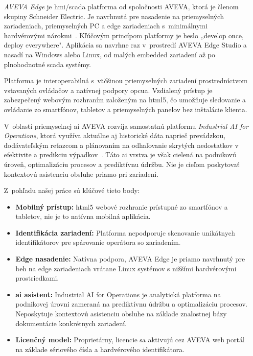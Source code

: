 \textit{AVEVA Edge} je \acrshort{hmi}/\acrshort{scada} platforma od
spoločnosti AVEVA, ktorá je členom skupiny Schneider Electric. Je navrhnutá pre nasadenie
na priemyselných zariadeniach, priemyselných PC a edge zariadeniach
s~minimálnymi hardvérovými nárokmi~\cite{t06}. Kľúčovým princípom platformy je
heslo „develop once, deploy everywhere". Aplikácia sa navrhne raz v~prostredí
AVEVA Edge Studio a nasadí na Windows alebo Linux, od malých embedded zariadení až po plnohodnotné \acrshort{scada} systémy.

Platforma je interoperabilná s~väčšinou priemyselných zariadení prostredníctvom
vstavaných ovládačov a natívnej podpory \acrshort{opcua}. Vzdialený prístup je
zabezpečený webovým rozhraním založeným na \acrshort{html}5, čo umožňuje
sledovanie a ovládanie zo smartfónov, tabletov a priemyselných panelov bez
inštalácie klienta.

V~oblasti priemyselnej \acrshort{ai} AVEVA rozvíja samostatnú platformu
\textit{Industrial AI for Operations}, ktorá využíva aktuálne aj
historické dáta naprieč prevádzkou, dodávateľským reťazcom a plánovaním na
odhaľovanie skrytých nedostatkov v efektivite a predikciu výpadkov~\cite{t07}. Táto
\acrshort{ai} vrstva je však cielená na podnikovú úroveň, optimalizáciu
procesov a prediktívnu údržbu. Nie je cieľom poskytovať kontextovú asistenciu
obsluhe priamo pri zariadení.

Z~pohľadu našej práce sú kľúčové tieto body:

\begin{itemize}
      \item \textbf{Mobilný prístup:} \acrshort{html}5 webové rozhranie prístupné
            zo smartfónov a tabletov, nie je to natívna mobilná aplikácia.
      \item \textbf{Identifikácia zariadení:} Platforma nepodporuje
            skenovanie unikátnych identifikátorov pre spárovanie
            operátora so zariadením.
      \item \textbf{Edge nasadenie:} Natívna podpora, AVEVA Edge je
            priamo navrhnutý pre beh na edge zariadeniach vrátane
            Linux systémov s nižšími hardvérovými prostriedkami.
      \item \textbf{\acrshort{ai} asistent:} Industrial AI for Operations je
            analytická platforma na podnikovej úrovni zameraná na
            prediktívnu údržbu a optimalizáciu procesov. Neposkytuje
            kontextovú asistenciu obsluhe na základe znalostnej bázy
            dokumentácie konkrétnych zariadení.
      \item \textbf{Licenčný model:} Proprietárny, licencie sa aktivujú
            cez AVEVA web portál na základe sériového čísla a hardvérového
            identifikátora.
\end{itemize}

